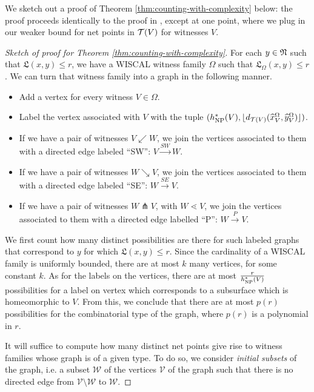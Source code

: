 \documentclass[12pt, reqno]{amsart}
\begin{document}
We sketch out a proof of Theorem \ref{thm:counting-with-complexity} below: the proof proceeds identically to the proof in \textcite{dowdall2023lattice}, except at one point, where we plug in our weaker bound for net points in $\mathcal{T}(V)$ for witnesses $V$.

\begin{proof}[Sketch of proof for Theorem \ref{thm:counting-with-complexity}]
  For each $y \in \mathfrak{N}$ such that $\mathfrak{L}(x,y) \leq r$, we have a WISCAL witness family $\Omega$ such that $\mathfrak{L}_{\Omega}(x,y) \leq r$.
  We can turn that witness family into a graph in the following manner.
  \begin{itemize}
  \item Add a vertex for every witness $V \in \Omega$.
  \item Label the vertex associated with $V$ with the tuple $(h_{\mathrm{NP}}^{\ast}(V), \lfloor d_{\mathcal{T}(V)}(\widehat{x}_{V}^{\Omega}, \widehat{y}_{V}^{\Omega}) \rfloor)$.
  \item If we have a pair of witnesses $V \swarrow W$, we join the vertices associated to them with a directed edge labeled ``SW'': $V \xrightarrow{SW} W$.
  \item If we have a pair of witnesses $W \searrow V$, we join the vertices associated to them with a directed edge labeled ``SE'': $W \xrightarrow{SE} V$.
  \item If we have a pair of witnesses $W \pitchfork V$, with $W \lessdot V$, we join the vertices associated to them with a directed edge labelled ``P'': $W \xrightarrow{P} V$.
  \end{itemize}

  We first count how many distinct possibilities are there for such labeled graphs that correspond to $y$ for which $\mathfrak{L}(x,y) \leq r$.
  Since the cardinality of a WISCAL family is uniformly bounded, there are at most $k$ many vertices, for some constant $k$.
  As for the labels on the vertices, there are at most $\frac{r}{h_{\mathrm{NP}}^{\ast}(V)}$ possibilities for a label on vertex which corresponds to a subsurface which is homeomorphic to $V$.
  From this, we conclude that there are at most $p(r)$ possibilities for the combinatorial type of the graph, where $p(r)$ is a polynomial in $r$.

  It will suffice to compute how many distinct net points give rise to witness families whose graph is of a given type.
  To do so, we consider \emph{initial subsets} of the graph, i.e. a subset $\mathcal{W}$ of the vertices $\mathcal{V}$ of the graph such that there is no directed edge from $\mathcal{V} \setminus \mathcal{W}$ to $\mathcal{W}$.


\end{proof}
\end{document}
